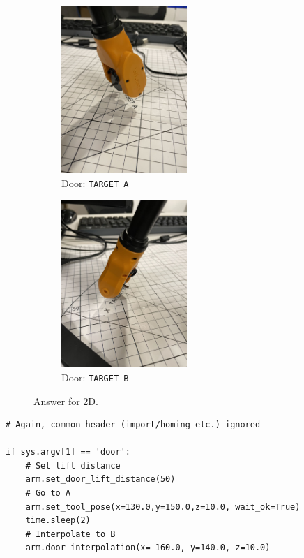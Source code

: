 \newpage
\begin{figure}[hb!]
     \centering
    \begin{subfigure}[b]{0.3\textwidth}
        \includegraphics[height=2.5in]{image/2d_door_a.jpg}
         \caption*{Door: \texttt{TARGET A}}
     \end{subfigure}
     \hfill
     \begin{subfigure}[b]{0.3\textwidth}
        \includegraphics[height=2.5in]{image/2d_door_b.jpg}
         \caption*{Door: \texttt{TARGET B}}
     \end{subfigure}
    \caption*{Answer for 2D.}
\end{figure}
%
\begin{verbatim}
# Again, common header (import/homing etc.) ignored

if sys.argv[1] == 'door':
    # Set lift distance
    arm.set_door_lift_distance(50)
    # Go to A
    arm.set_tool_pose(x=130.0,y=150.0,z=10.0, wait_ok=True)
    time.sleep(2)
    # Interpolate to B
    arm.door_interpolation(x=-160.0, y=140.0, z=10.0)
\end{verbatim}

